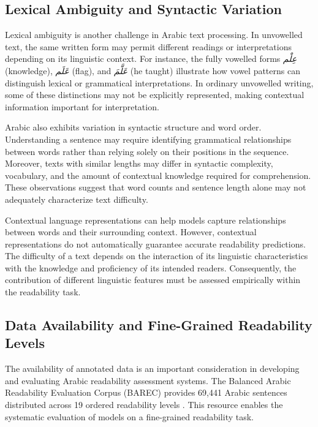 \documentclass[12pt]{report}
\begin{document}
\subsection{Lexical Ambiguity and Syntactic Variation}

Lexical ambiguity is another challenge in Arabic text processing. In unvowelled text, the same written form may permit different readings or interpretations depending on its linguistic context. For instance, the fully vowelled forms \textit{عِلْم} (knowledge), \textit{عَلَم} (flag), and \textit{عَلَّمَ} (he taught) illustrate how vowel patterns can distinguish lexical or grammatical interpretations. In ordinary unvowelled writing, some of these distinctions may not be explicitly represented, making contextual information important for interpretation.

Arabic also exhibits variation in syntactic structure and word order. Understanding a sentence may require identifying grammatical relationships between words rather than relying solely on their positions in the sequence. Moreover, texts with similar lengths may differ in syntactic complexity, vocabulary, and the amount of contextual knowledge required for comprehension. These observations suggest that word counts and sentence length alone may not adequately characterize text difficulty.

Contextual language representations can help models capture relationships between words and their surrounding context. However, contextual representations do not automatically guarantee accurate readability predictions. The difficulty of a text depends on the interaction of its linguistic characteristics with the knowledge and proficiency of its intended readers. Consequently, the contribution of different linguistic features must be assessed empirically within the readability task.

\subsection{Data Availability and Fine-Grained Readability Levels}

The availability of annotated data is an important consideration in developing and evaluating Arabic readability assessment systems. The Balanced Arabic Readability Evaluation Corpus (BAREC) provides 69,441 Arabic sentences distributed across 19 ordered readability levels \cite{elmadani2025barec}. This resource enables the systematic evaluation of models on a fine-grained readability task.
\end{document}
